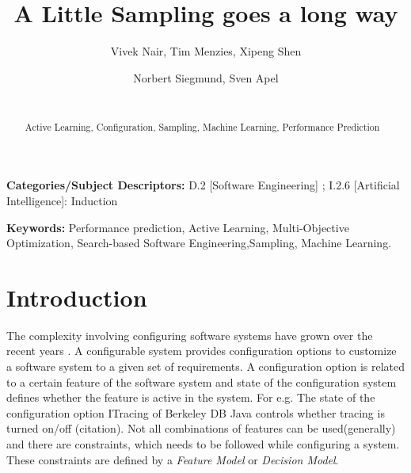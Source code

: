 \documentclass{sig-alternative}
\begin{document}
\title{ A Little Sampling goes a long way}
\author{
        \alignauthor Vivek Nair, Tim Menzies, Xipeng Shen 
    \and  
        \alignauthor Norbert Siegmund, Sven Apel \\
        \\
       }

\maketitle 
\thispagestyle{plain}
\pagestyle{plain}
\begin{abstract}
Active Learning, Configuration, Sampling, Machine Learning, Performance Prediction


\end{abstract}

\vspace{1mm}
\noindent
{\bf Categories/Subject Descriptors:} 
D.2 [Software Engineering] ;
I.2.6 [Artificial Intelligence]: Induction

 
\vspace{1mm}
\noindent

{\bf Keywords:} Performance prediction, Active Learning, 
Multi-Objective Optimization,
Search-based Software Engineering,Sampling, Machine Learning.

 
 
\section{Introduction}
 The complexity involving configuring software systems have grown over the recent years \cite{berger2013study}. A configurable system provides configuration options to customize a software system to a given set of requirements. 
 A configuration option is related to a certain feature of the software system and state of the configuration system defines whether the feature is  active in the system.
 For e.g. The state of the configuration option ITracing of  Berkeley DB Java controls whether tracing is turned on/off (citation). Not all combinations of features can be used(generally) and there are constraints, which needs to be followed while configuring a system. These constraints are defined by a \textit{Feature Model}\cite{kang1990feature} or \textit{Decision Model}\cite{schmid2011comparison}. 
 
\end{document}
